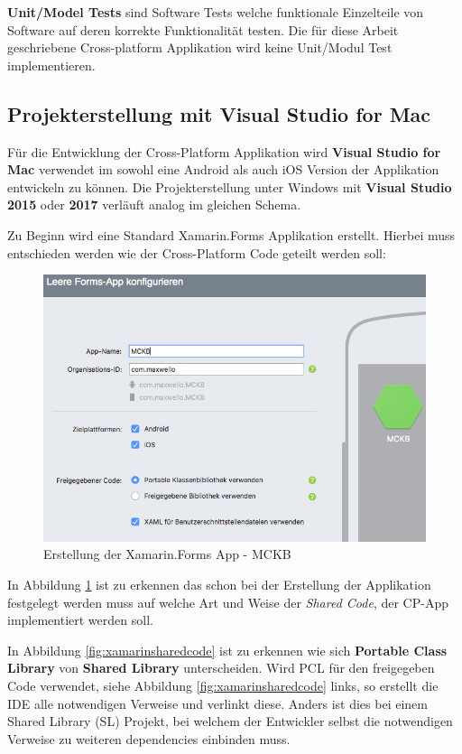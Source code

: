 	\textbf{Unit/Model Tests} sind Software Tests welche funktionale Einzelteile von Software auf deren korrekte Funktionalität testen. Die für diese Arbeit geschriebene Cross-platform Applikation wird keine Unit/Modul Test implementieren.

\newpage
\subsection{Projekterstellung mit Visual Studio for Mac}
\label{sec:xamarincreateproject}

	Für die Entwicklung der Cross-Platform Applikation wird \textbf{Visual Studio for Mac} verwendet im sowohl eine Android als auch iOS Version der Applikation entwickeln zu können. Die Projekterstellung unter Windows mit \textbf{Visual Studio 2015} oder \textbf{2017} verläuft analog im gleichen Schema.

	Zu Beginn wird eine Standard Xamarin.Forms Applikation erstellt. Hierbei muss entschieden werden wie der Cross-Platform Code geteilt werden soll:

	\begin{figure}[h!]
		\centering
		\includegraphics[width=1\textwidth]{images/Project-Setup-one.png}
		\caption{Erstellung der Xamarin.Forms App - MCKB}
		\label{fig:xamarinprojectstart}
	\end{figure}

	In Abbildung \ref{fig:xamarinprojectstart} ist zu erkennen das schon bei der Erstellung der Applikation festgelegt werden muss auf welche Art und Weise der \textit{Shared Code}, der CP-App implementiert werden soll.

	In Abbildung \ref{fig:xamarinsharedcode} ist zu erkennen wie sich \textbf{Portable Class Library} von \textbf{Shared Library} unterscheiden. Wird PCL für den freigegeben Code verwendet, siehe Abbildung \ref{fig:xamarinsharedcode} links, so erstellt die IDE alle notwendigen Verweise und verlinkt diese. Anders ist dies bei einem Shared Library (SL) Projekt, bei welchem der Entwickler selbst die notwendigen Verweise zu weiteren dependencies einbinden muss.


